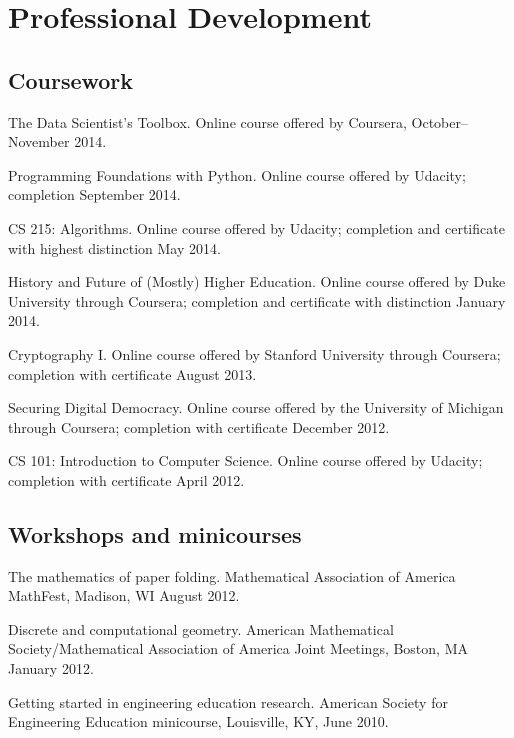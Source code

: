 \documentclass[letterpaper]{article}
\renewenvironment{itemize}{
  \begin{list}{}{
    \setlength{\leftmargin}{1.5em}
	\setlength{\itemsep}{0in}
  }
}{
  \end{list}
}
\begin{document}
\section*{Professional Development}

\subsection*{Coursework}
\begin{itemize}
	\item The Data Scientist's Toolbox. Online course offered by Coursera, October--November 2014. 
	\item Programming Foundations with Python. Online course offered by Udacity; completion September 2014. 
	\item CS 215: Algorithms. Online course offered by Udacity; completion and certificate with highest distinction May 2014.  
	\item History and Future of (Mostly) Higher Education. Online course offered by Duke University through Coursera; completion and certificate with distinction January 2014. 
	\item Cryptography I. Online course offered by Stanford University through Coursera; completion with certificate August 2013. 
	\item Securing Digital Democracy. Online course offered by the University of Michigan through Coursera; completion with certificate December 2012.
	\item CS 101: Introduction to Computer Science. Online course offered by Udacity; completion with certificate April 2012. 
\end{itemize}


\subsection*{Workshops and minicourses}

\begin{itemize}
	\item The mathematics of paper folding. Mathematical Association of America MathFest, Madison, WI August 2012. 
	\item Discrete and computational geometry. American Mathematical Society/Mathematical Association of America Joint Meetings, Boston, MA January 2012. 
	\item Getting started in engineering education research. American Society for Engineering Education minicourse, Louisville, KY, June 2010. 
\end{itemize}
\end{document}

